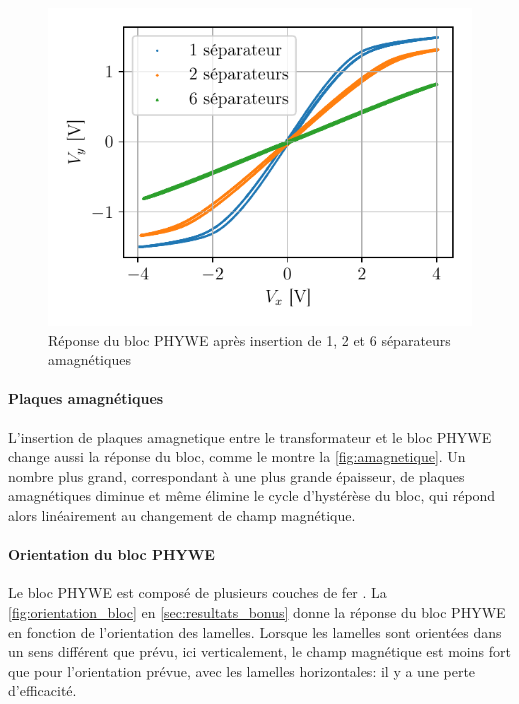 \begin{figure}
    \centering
    \includegraphics[width=\linewidth]{figures/separateurs_amagnetique.pdf}
    \caption{Réponse du bloc PHYWE après insertion de 1, 2 et 6 séparateurs amagnétiques}
    \label{fig:amagnetique}
\end{figure}

\paragraph{Plaques amagnétiques}
L'insertion de plaques amagnetique entre le transformateur et le bloc PHYWE change aussi la réponse du bloc, comme le montre la \autoref{fig:amagnetique}. Un nombre plus grand, correspondant à une plus grande épaisseur, de plaques amagnétiques diminue et même élimine le cycle d'hystérèse du bloc, qui répond alors linéairement au changement de champ magnétique.

\paragraph{Orientation du bloc PHYWE}
Le bloc PHYWE est composé de plusieurs couches de fer \cite{bloc_phywe}. La \autoref{fig:orientation_bloc} en \autoref{sec:resultats_bonus} donne la réponse du bloc PHYWE en fonction de l'orientation des lamelles. Lorsque les lamelles sont orientées dans un sens différent que prévu, ici verticalement, le champ magnétique est moins fort que pour l'orientation prévue, avec les lamelles horizontales: il y a une perte d'efficacité.
